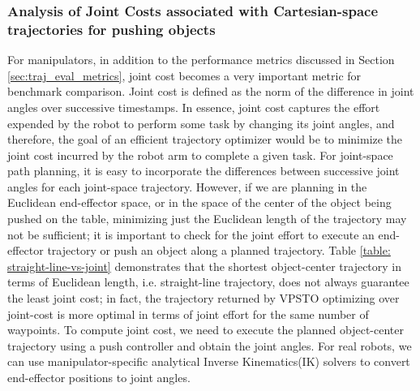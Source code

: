 \subsubsection{Analysis of Joint Costs associated with Cartesian-space trajectories for pushing objects}

For manipulators, in addition to the performance metrics discussed in Section \ref{sec:traj_eval_metrics}, joint cost becomes a very important metric for benchmark comparison. Joint cost is defined as the norm of the difference in joint angles over successive timestamps. In essence, joint cost captures the effort expended by the robot to perform some task by changing its joint angles, and therefore, the goal of an efficient trajectory optimizer would be to minimize the joint cost incurred by the robot arm to complete a given task. For joint-space path planning, it is easy to incorporate the differences between successive joint angles for each joint-space trajectory. However, if we are planning in the Euclidean end-effector space, or in the space of the center of the object being pushed on the table, minimizing just the Euclidean length of the trajectory may not be sufficient; it is important to check for the joint effort to execute an end-effector trajectory or push an object along a planned trajectory. Table \ref{table: straight-line-vs-joint} demonstrates that the shortest object-center trajectory in terms of Euclidean length, i.e. straight-line trajectory, does not always guarantee the least joint cost; in fact, the trajectory returned by VPSTO optimizing over joint-cost is more optimal in terms of joint effort for the same number of waypoints. To compute joint cost, we need to execute the planned object-center trajectory using a push controller and obtain the joint angles. For real robots, we can use manipulator-specific analytical Inverse Kinematics(IK) solvers\cite{Analytical_IK} to convert end-effector positions to joint angles. 

